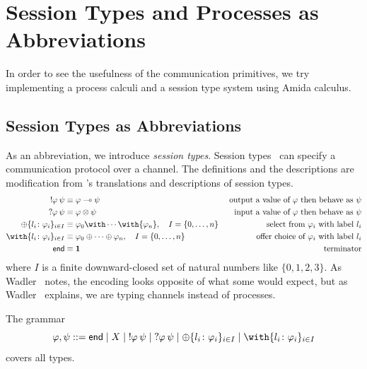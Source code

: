   \section{Session Types and Processes as Abbreviations}
  \label{sec:session-process}

    In order to see the usefulness of the communication primitives,
    we try implementing a process calculi and a session type system
    using Amida calculus.

    \subsection{Session Types as Abbreviations}

    As an abbreviation, we introduce \textit{session
    types}.
    Session types~\cite{honda-session} can specify a communication
    protocol over a channel.
    The definitions and the descriptions are modification from
    \citet{wadler2012propositions}'s translations and descriptions of
    session types.
    \begin{align*}
     \sendtype\phi\psi&\equiv \phi\limp\psi &\text{
     output a value of $\phi$ then behave as $\psi$} \\
     \recvtype\phi\psi&\equiv \phi\otimes\psi &\text{input a value of
     $\phi$ then behave as $\psi$}\\
     \oplus\{l_i\colon \phi_i\}_{i\in I} &\equiv {\phi_0}\with
     \cdots \with {\phi_n}, \quad I = \{0,\ldots,n\} & \text{select from
     $\phi_i$ with label $l_i$}\\
     \with\{l_i\colon \phi_i\}_{i\in I} &\equiv {\phi_0}\oplus
     \cdots \oplus {\phi_n}, \quad I = \{0,\ldots,n\}& \text{offer choice of
     $\phi_i$ with label $l_i$}
     \\
     \terminate &\equiv \one &\text{terminator}
    \end{align*}
    where $I$ is a finite downward-closed set of natural numbers like
    $\{0,1,2,3\}$.
    As Wadler~\citep{wadler2012propositions} notes, the encoding looks
    opposite of what some would expect, but as
    Wadler~\citep{wadler2012propositions} explains, we are
    typing channels instead of processes.

    The grammar
    \[
     \phi,\psi ::= \terminate\mid X \mid \sendtype\phi\psi \mid
     \recvtype\phi\psi
     \mid \oplus\{l_i\colon\phi_i\}_{i\in I}
     \mid \with\{l_i\colon\phi_i\}_{i\in I}
    \]
    covers all types.


